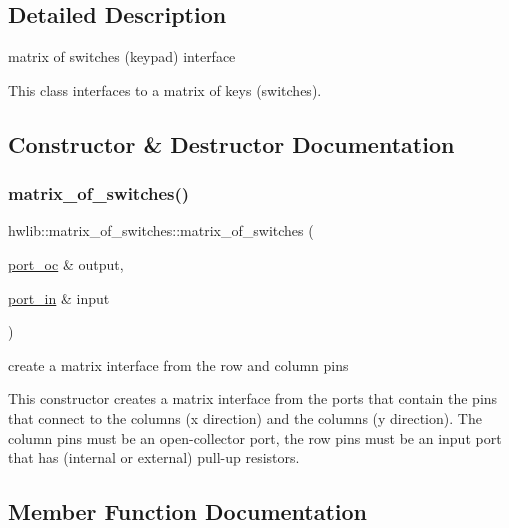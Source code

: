 \subsection{Detailed Description}
matrix of switches (keypad) interface 

This class interfaces to a matrix of keys (switches). 

\subsection{Constructor \& Destructor Documentation}
\mbox{\label{classhwlib_1_1matrix__of__switches_a7b6df331ad1f31001ec0ab3ac51ecbc9}} 
\subsubsection{\texorpdfstring{matrix\+\_\+of\+\_\+switches()}{matrix\_of\_switches()}}
{\footnotesize\ttfamily hwlib\+::matrix\+\_\+of\+\_\+switches\+::matrix\+\_\+of\+\_\+switches (\begin{DoxyParamCaption}\item[{\hyperlink{classhwlib_1_1port__oc}{port\+\_\+oc} \&}]{output,  }\item[{\hyperlink{classhwlib_1_1port__in}{port\+\_\+in} \&}]{input }\end{DoxyParamCaption})\hspace{0.3cm}{\ttfamily [inline]}}



create a matrix interface from the row and column pins 

This constructor creates a matrix interface from the ports that contain the pins that connect to the columns (x direction) and the columns (y direction). The column pins must be an open-\/collector port, the row pins must be an input port that has (internal or external) pull-\/up resistors. 

\subsection{Member Function Documentation}
\mbox{\label{classhwlib_1_1matrix__of__switches_a7af15bdf772a3c90818e79b6b69c85c0}} 

